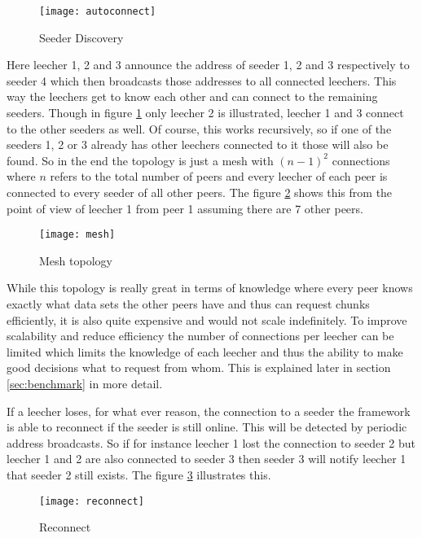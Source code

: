 \begin{figure}[H]
\centering
\texttt{[image: autoconnect]}
\caption{Seeder Discovery}
\label{fig:autoconnect}
\end{figure}

Here leecher 1, 2 and 3 announce the address of seeder 1, 2 and 3 respectively to seeder 4 which then broadcasts those addresses to all connected leechers. This way the leechers get to know each other and can connect to the remaining seeders. Though in figure \ref{fig:autoconnect} only leecher 2 is illustrated, leecher 1 and 3 connect to the other seeders as well. Of course, this works recursively, so if one of the seeders 1, 2 or 3 already has other leechers connected to it those will also be found. So in the end the topology is just a mesh with $(n-1)^2$ connections where $n$ refers to the total number of peers and every leecher of each peer is connected to every seeder of all other peers. The figure \ref{fig:mesh} shows this from the point of view of leecher 1 from peer 1 assuming there are 7 other peers.

\begin{figure}[H]
\centering
\texttt{[image: mesh]}
\caption{Mesh topology}
\label{fig:mesh}
\end{figure}

While this topology is really great in terms of knowledge where every peer knows exactly what data sets the other peers have and thus can request chunks efficiently, it is also quite expensive and would not scale indefinitely. To improve scalability and reduce efficiency the number of connections per leecher can be limited which limits the knowledge of each leecher and thus the ability to make good decisions what to request from whom. This is explained later in section \ref{sec:benchmark} in more detail.

If a leecher loses, for what ever reason, the connection to a seeder the framework is able to reconnect if the seeder is still online. This will be detected by periodic address broadcasts. So if for instance leecher 1 lost the connection to seeder 2 but leecher 1 and 2 are also connected to seeder 3 then seeder 3 will notify leecher 1 that seeder 2 still exists. The figure \ref{fig:reconnect} illustrates this.

\begin{figure}[H]
\centering
\texttt{[image: reconnect]}
\caption{Reconnect}
\label{fig:reconnect}
\end{figure}


